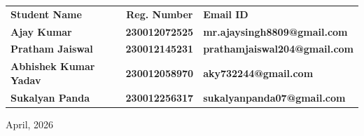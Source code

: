 \begin{center}

    \vspace{5mm}





    
\begin{table}[H]
\centering
\renewcommand{\arraystretch}{1.4}
    \begin{tabular}{lcl}
    \textbf{Student Name} & \textbf{Reg. Number} & \textbf{Email ID}  \\ %

    \textbf{Ajay Kumar} & \textbf{230012072525} & \textbf{mr.ajaysingh8809@gmail.com} \\ 
    
    \textbf{Pratham Jaiswal} & \textbf{230012145231} & \textbf{prathamjaiswal204@gmail.com} \\
    
    \textbf{Abhishek Kumar Yadav} & \textbf{230012058970} & \textbf{aky732244@gmail.com} \\ 

    \textbf{Sukalyan Panda} & \textbf{230012256317} & \textbf{sukalyanpanda07@gmail.com} \\ 
          
    \end{tabular}
\end{table}


 \vspace{2cm}


    \vspace{1cm}




  
    

    \universityDetailsTitlePage
    \vspace{-0.6cm}

    
    \begin{center}
    \vspace{0.2cm}
        {\Large April, 2026 \par}
    \end{center}

    
\end{center}